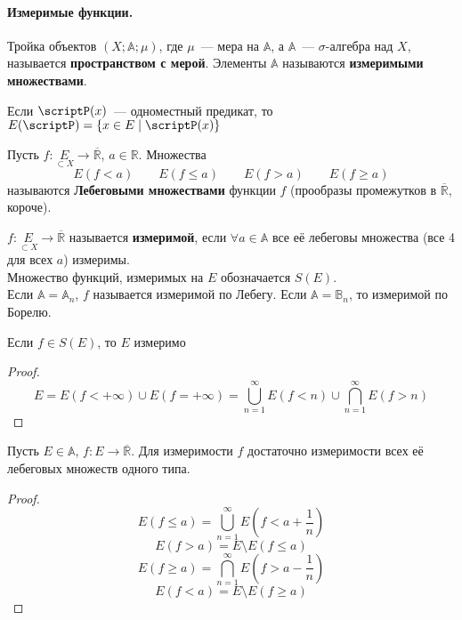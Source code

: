 \documentclass{article}
\begin{document}
    \paragraph{Измеримые функции.}
    \begin{definition}
        Тройка объектов $(X;\mathbb A;\mu)$, где $\mu$~--- мера на $\mathbb A$, а $\mathbb A$~--- $\sigma$-алгебра над $X$, называется \textbf{пространством с мерой}. Элементы $\mathbb A$ называются \textbf{измеримыми множествами}.
    \end{definition}
    \begin{definition}
        Если $\scriptP(x)$~--- одноместный предикат, то $E(\scriptP)=\{x\in E\mid\scriptP(x)\}$
    \end{definition}
    \begin{definition}
        Пусть $f\colon\underset{\subset X}E\to\overline{\mathbb R}$, $a\in\mathbb R$. Множества
        $$
        E(f<a)\qquad E(f\leqslant a)\qquad E(f>a)\qquad E(f\geqslant a)
        $$
        называются \textbf{Лебеговыми множествами} функции $f$ (прообразы промежутков в $\overline{\mathbb R}$, короче).
    \end{definition}
    \begin{definition}
        $f\colon\underset{\subset X}E\to\overline{\mathbb R}$ называется \textbf{измеримой}, если $\forall a\in\mathbb A$ все её лебеговы множества (все 4 для всех $a$) измеримы.\\
        Множество функций, измеримых на $E$ обозначается $S(E)$.\\
        Если $\mathbb A=\mathbb A_n$, $f$ называется измеримой по Лебегу. Если $\mathbb A=\mathbb B_n$, то измеримой по Борелю.
    \end{definition}
    \begin{claim}
        Если $f\in S(E)$, то $E$ измеримо
    \end{claim}
    \begin{proof}
        $$
        E=E(f<+\infty)\cup E(f=+\infty)=\bigcup\limits_{n=1}^\infty E(f<n)\cup\bigcap\limits_{n=1}^\infty E(f>n)
        $$
    \end{proof}
    \begin{lemma}
        Пусть $E\in\mathbb A$, $f\colon E\to\overline{\mathbb R}$. Для измеримости $f$ достаточно измеримости всех её лебеговых множеств одного типа.
    \end{lemma}
    \begin{proof}
        $$E(f\leqslant a)=\bigcup\limits_{n=1}^\infty E\left(f<a+\frac1n\right)$$
        $$E(f>a)=E\setminus E(f\leqslant a)$$
        $$E(f\geqslant a)=\bigcap\limits_{n=1}^\infty E\left(f>a-\frac1n\right)$$
        $$E(f<a)=E\setminus E(f\geqslant a)$$
    \end{proof}
\end{document}
